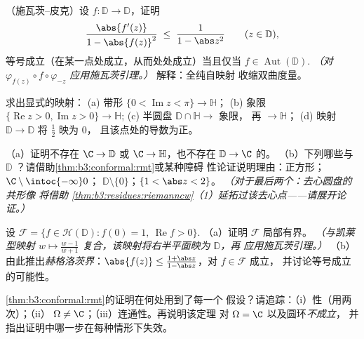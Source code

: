\begin{exercise}[$\star\star$]\label{exo:b3:conformal:3}
（施瓦茨--皮克）设 $f\colon \mathbb D \to
\mathbb D$，证明
\[
\frac{\abs{f'(z)}}{1 - \abs{f(z)}^2} \;\leq\;
\frac{1}{1 - \abs z^2}
\qquad (z \in \mathbb D),
\]
等号成立（在某一点处成立，从而处处成立）当且仅当 $f \in
\operatorname{Aut}(\mathbb D)$.
\emph{（对 $\varphi_{f(z)}\circ
f\circ\varphi_{-z}$ 应用施瓦茨引理。）} 解释：全纯自映射
收缩双曲度量。
\end{exercise}

\begin{exercise}[$\star\star$]\label{exo:b3:conformal:4}
求出显式的映射：
(a) 带形 $\{0 < \operatorname{Im}z < \pi\} \to \mathbb H$；
(b) 象限 $\{\operatorname{Re}z > 0,
\operatorname{Im}z > 0\} \to \mathbb H$;
(c) 半圆盘 $\mathbb D\cap\mathbb H \to$ 象限，
再 $\to \mathbb H$；
(d) 映射 $\mathbb D \to \mathbb D$ 将 $\frac12$ 映为 $0$，
且该点处的导数为正。
\end{exercise}

\begin{exercise}[$\star\star$]\label{exo:b3:conformal:5}
（a）证明不存在 $\C \to \mathbb D$ 或 $\C \to
\mathbb H$，也不存在 $\mathbb D \to \C$ 的。
（b）下列哪些与
$\mathbb D$ ？请借助\cref{thm:b3:conformal:rmt}或某种障碍
性论证说明理由：正方形；$\C\setminus\intoc{-\infty}0$；
$\mathbb D\setminus\{0\}$；$\{1 < \abs z < 2\}$。
\emph{（对于最后两个：去心圆盘的共形像
将借助
\cref{thm:b3:residues:riemanncw}（1）延拓过该去心点——请展开论证。）}
\end{exercise}

\begin{exercise}[$\star\star$]\label{exo:b3:conformal:6}
设 $\mathcal F = \{f \in \mathcal H(\mathbb D) : f(0) = 1,\
\operatorname{Re}f > 0\}$.
（a）证明 $\mathcal F$ 局部有界。
\emph{（与凯莱型映射 $w \mapsto \frac{w -
1}{w + 1}$ 复合，该映射将右半平面映为 $\mathbb D$，再
应用施瓦茨引理。）}
（b）由此推出\emph{赫格洛茨界}：$\abs{f(z)} \leq
\frac{1 + \abs z}{1 - \abs z}$，对 $f \in \mathcal F$ 成立，
并讨论等号成立的可能性。
\end{exercise}

\begin{exercise}[$\star\star\star$]\label{exo:b3:conformal:7}
\cref{thm:b3:conformal:rmt}的证明在何处用到了每一个
假设？请追踪：（i）性（用两次）；（ii）
$\Omega \neq \C$；（iii）连通性。再说明该定理
对 $\Omega = \C$ 以及圆环\emph{不成立}，
并指出证明中哪一步在每种情形下失效。
\end{exercise}

